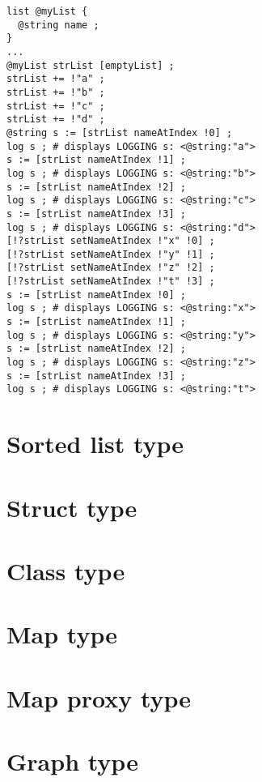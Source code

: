 \begin{lstlisting}[language=galgas]
list @myList {
  @string name ;
}
...
@myList strList [emptyList] ;
strList += !"a" ;
strList += !"b" ;
strList += !"c" ;
strList += !"d" ;
@string s := [strList nameAtIndex !0] ;
log s ; # displays LOGGING s: <@string:"a">
s := [strList nameAtIndex !1] ;
log s ; # displays LOGGING s: <@string:"b">
s := [strList nameAtIndex !2] ;
log s ; # displays LOGGING s: <@string:"c">
s := [strList nameAtIndex !3] ;
log s ; # displays LOGGING s: <@string:"d">
[!?strList setNameAtIndex !"x" !0] ;
[!?strList setNameAtIndex !"y" !1] ;
[!?strList setNameAtIndex !"z" !2] ;
[!?strList setNameAtIndex !"t" !3] ;
s := [strList nameAtIndex !0] ;
log s ; # displays LOGGING s: <@string:"x">
s := [strList nameAtIndex !1] ;
log s ; # displays LOGGING s: <@string:"y">
s := [strList nameAtIndex !2] ;
log s ; # displays LOGGING s: <@string:"z">
s := [strList nameAtIndex !3] ;
log s ; # displays LOGGING s: <@string:"t">
\end{lstlisting}















\section{Sorted list type}


\section{Struct type}



\section{Class type}


\section{Map type}


\section{Map proxy type}




\section{Graph type}

